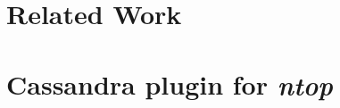 \documentclass[a4,12pt,oneside]{book}
\begin{document}
\chapter{\label{chap:survey}Related Work}

\chapter{\label{chap:our-idea} Cassandra plugin for \emph{ntop}}

%
%
%
%
\nocite{*}

\newpage
{}

\newpage
{}
\end{document}
